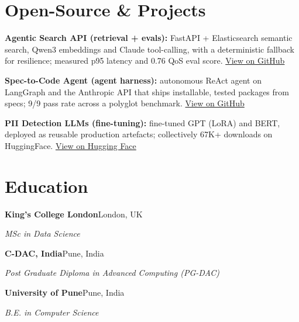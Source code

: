 \documentclass[10pt,a4paper]{article}
\begin{document}
\section{Open-Source \& Projects}
\begin{tight}
  \item \textbf{Agentic Search API (retrieval + evals):} FastAPI + Elasticsearch semantic search, Qwen3 embeddings and Claude tool-calling, with a deterministic fallback for resilience; measured p95 latency and 0.76 QoS eval score. \href{https://github.com/abhijeetscode/search-agent}{View on GitHub}
  \item \textbf{Spec-to-Code Agent (agent harness):} autonomous ReAct agent on LangGraph and the Anthropic API that ships installable, tested packages from specs; 9/9 pass rate across a polyglot benchmark. \href{https://github.com/abhijeetscode/Spec-to-Code-Agent}{View on GitHub}
  \item \textbf{PII Detection LLMs (fine-tuning):} fine-tuned GPT (LoRA) and BERT, deployed as reusable production artefacts; collectively 67K+ downloads on HuggingFace. \href{https://huggingface.co/ab-ai/pii_model}{View on Hugging Face}
\end{tight}

\section{Education}
{\color{company}\bfseries King's College London}\hfill {\color{muted}London, UK}\par
{\itshape MSc in Data Science}\par\vspace{2pt}
{\color{company}\bfseries C-DAC, India}\hfill {\color{muted}Pune, India}\par
{\itshape Post Graduate Diploma in Advanced Computing (PG-DAC)}\par\vspace{2pt}
{\color{company}\bfseries University of Pune}\hfill {\color{muted}Pune, India}\par
{\itshape B.E. in Computer Science}\par
\end{document}
